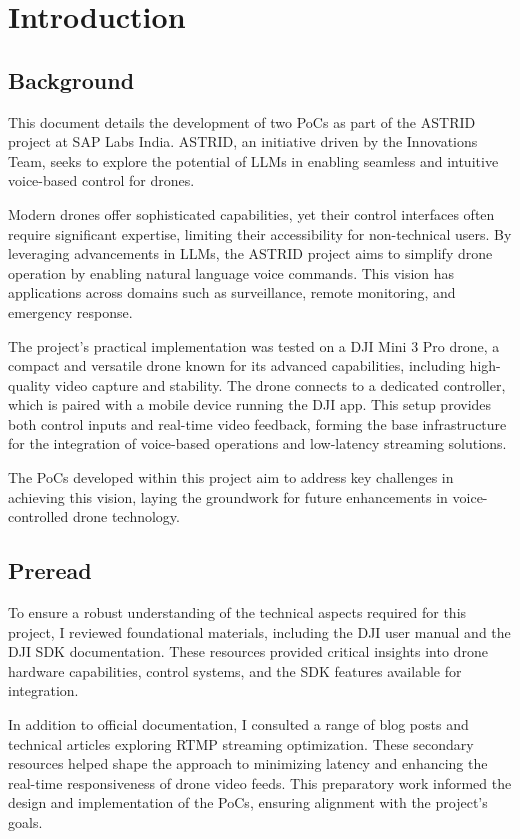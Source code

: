 \chapter{Introduction}
\label{introduction}
\nocite{*}

\section{Background}
This document details the development of two \acp{PoC} as part of the \ac{ASTRID} project at SAP Labs India. \ac{ASTRID}, an initiative driven by the Innovations Team, 
seeks to explore the potential of \acp{LLM} in enabling seamless and intuitive voice-based control for drones. 

Modern drones offer sophisticated capabilities, yet their control interfaces often require significant expertise, limiting their accessibility for non-technical users. 
By leveraging advancements in \acp{LLM}, the \ac{ASTRID} project aims to simplify drone operation by enabling natural language voice commands. 
This vision has applications across domains such as surveillance, remote monitoring, and emergency response.

The project's practical implementation was tested on a DJI Mini 3 Pro drone, a compact and versatile drone known for its advanced capabilities, including high-quality video capture and stability. 
The drone connects to a dedicated controller, which is paired with a mobile device running the DJI app. 
This setup provides both control inputs and real-time video feedback, forming the base infrastructure for the integration of voice-based operations and low-latency streaming solutions.

The \acp{PoC} developed within this project aim to address key challenges in achieving this vision, laying the groundwork for future enhancements in voice-controlled drone technology.

\section{Preread}
To ensure a robust understanding of the technical aspects required for this project, I reviewed foundational materials, including the DJI user manual and the DJI \ac{SDK} documentation. 
These resources provided critical insights into drone hardware capabilities, control systems, and the \ac{SDK} features available for integration. 

In addition to official documentation, I consulted a range of blog posts and technical articles exploring \ac{RTMP} streaming optimization. 
These secondary resources helped shape the approach to minimizing latency and enhancing the real-time responsiveness of drone video feeds. 
This preparatory work informed the design and implementation of the \acp{PoC}, ensuring alignment with the project's goals.
